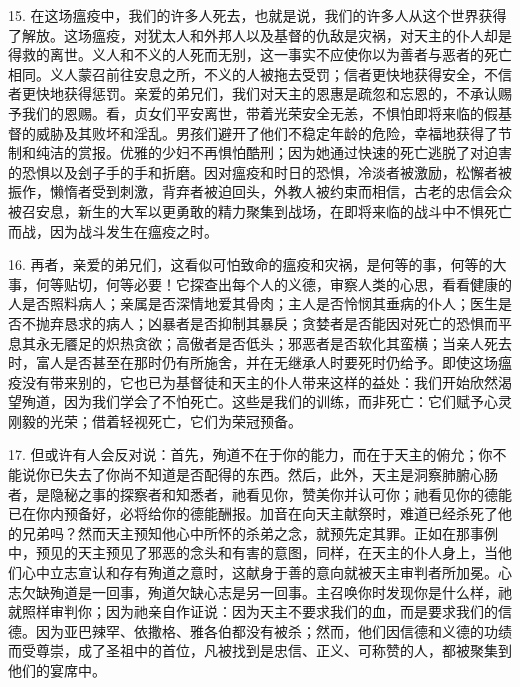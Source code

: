 15. 在这场瘟疫中，我们的许多人死去，也就是说，我们的许多人从这个世界获得了解放。这场瘟疫，对犹太人和外邦人以及基督的仇敌是灾祸，对天主的仆人却是得救的离世。义人和不义的人死而无别，这一事实不应使你以为善者与恶者的死亡相同。义人蒙召前往安息之所，不义的人被拖去受罚；信者更快地获得安全，不信者更快地获得惩罚。亲爱的弟兄们，我们对天主的恩惠是疏忽和忘恩的，不承认赐予我们的恩赐。看，贞女们平安离世，带着光荣安全无恙，不惧怕即将来临的假基督的威胁及其败坏和淫乱。男孩们避开了他们不稳定年龄的危险，幸福地获得了节制和纯洁的赏报。优雅的少妇不再惧怕酷刑；因为她通过快速的死亡逃脱了对迫害的恐惧以及刽子手的手和折磨。因对瘟疫和时日的恐惧，冷淡者被激励，松懈者被振作，懒惰者受到刺激，背弃者被迫回头，外教人被约束而相信，古老的忠信会众被召安息，新生的大军以更勇敢的精力聚集到战场，在即将来临的战斗中不惧死亡而战，因为战斗发生在瘟疫之时。\par

16. 再者，亲爱的弟兄们，这看似可怕致命的瘟疫和灾祸，是何等的事，何等的大事，何等贴切，何等必要！它探查出每个人的义德，审察人类的心思，看看健康的人是否照料病人；亲属是否深情地爱其骨肉；主人是否怜悯其垂病的仆人；医生是否不抛弃恳求的病人；凶暴者是否抑制其暴戾；贪婪者是否能因对死亡的恐惧而平息其永无餍足的炽热贪欲；高傲者是否低头；邪恶者是否软化其蛮横；当亲人死去时，富人是否甚至在那时仍有所施舍，并在无继承人时要死时仍给予。即使这场瘟疫没有带来别的，它也已为基督徒和天主的仆人带来这样的益处：我们开始欣然渴望殉道，因为我们学会了不怕死亡。这些是我们的训练，而非死亡：它们赋予心灵刚毅的光荣；借着轻视死亡，它们为荣冠预备。\par

17. 但或许有人会反对说：首先，殉道不在于你的能力，而在于天主的俯允；你不能说你已失去了你尚不知道是否配得的东西。然后，此外，天主是洞察肺腑心肠者，是隐秘之事的探察者和知悉者，祂看见你，赞美你并认可你；祂看见你的德能已在你内预备好，必将给你的德能酬报。加音在向天主献祭时，难道已经杀死了他的兄弟吗？然而天主预知他心中所怀的杀弟之念，就预先定其罪。正如在那事例中，预见的天主预见了邪恶的念头和有害的意图，同样，在天主的仆人身上，当他们心中立志宣认和存有殉道之意时，这献身于善的意向就被天主审判者所加冕。心志欠缺殉道是一回事，殉道欠缺心志是另一回事。主召唤你时发现你是什么样，祂就照样审判你；因为祂亲自作证说：因为天主不要求我们的血，而是要求我们的信德。因为亚巴辣罕、依撒格、雅各伯都没有被杀；然而，他们因信德和义德的功绩而受尊崇，成了圣祖中的首位，凡被找到是忠信、正义、可称赞的人，都被聚集到他们的宴席中。\par

